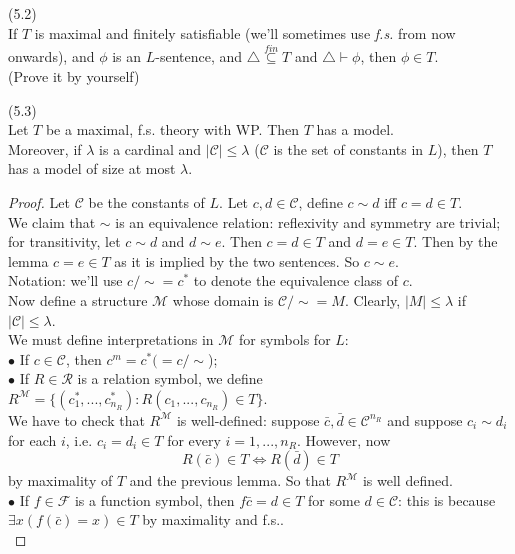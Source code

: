 \documentclass[a4paper]{article}
\begin{document}
\begin{lemma} (5.2)\\
    If $T$ is maximal and finitely satisfiable (we'll sometimes use \emph{f.s.} from now onwards), and $\phi$ is an $L$-sentence, and $\triangle \stackrel{fin}{\subseteq} T$ and $\triangle \vdash \phi$, then $\phi \in T$.\\
    (Prove it by yourself)
\end{lemma}

\begin{lemma} (5.3)\\
    Let $T$ be a maximal, f.s. theory with WP. Then $T$ has a model.\\
    Moreover, if $\lambda$ is a cardinal and $|\mathcal{C}| \leq \lambda$ ($\mathcal{C}$ is the set of constants in $L$), then $T$ has a model of size at most $\lambda$.
    \begin{proof}
        Let $\mathcal{C}$ be the constants of $L$. Let $c,d \in \mathcal{C}$, define $c \sim d$ iff $c=d \in T$.\\
        We claim that $\sim$ is an equivalence relation: reflexivity and symmetry are trivial; for transitivity, let $c \sim d$ and $d \sim e$. Then $c=d \in T$ and $d=e \in T$. Then by the lemma $c=e\in T$ as it is implied by the two sentences. So $c \sim e$.\\
        Notation: we'll use $c/\sim = c^*$ to denote the equivalence class of $c$.\\
        Now define a structure $\mathcal{M}$ whose domain is $\mathcal{C}/\sim = M$. Clearly, $|M| \leq \lambda$ if $|\mathcal{C}| \leq \lambda$.\\
        We must define interpretations in $\mathcal{M}$ for symbols for $L$:\\
        $\bullet$ If $c \in \mathcal{C}$, then $c^m = c^* (=c/\sim$);\\
        $\bullet$ If $R \in \mathcal{R}$ is a relation symbol, we define $R^{\mathcal{M}} = \{(c_1^*,...,c_{n_R}^*):R(c_1,...,c_{n_R}) \in T\}$.\\
        We have to check that $R^{\mathcal{M}}$ is well-defined: suppose $\bar{c},\bar{d} \in \mathcal{C}^{n_R}$ and suppose $c_i \sim d_i$ for each $i$, i.e. $c_i = d_i \in T$ for every $i=1,...,n_R$. However, now
        $$R(\bar{c}) \in T \iff R(\bar{d}) \in T$$
        by maximality of $T$ and the previous lemma. So that $R^{\mathcal{M}}$ is well defined.\\
        $\bullet$ If $f \in \mathcal{F}$ is a function symbol, then $f\bar{c} = d \in T$ for some $d \in \mathcal{C}$: this is because $\exists x(f(\bar{c})=x) \in T$ by maximality and f.s..\\

\end{proof}
\end{lemma}
\end{document}

